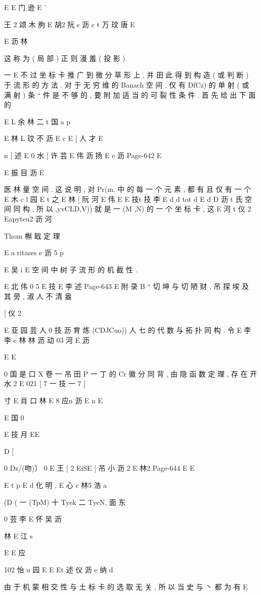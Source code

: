 E
E 门 逊
E '

王 2 颂 木 朐
E 胡2 阮
s 沥 c t 万 玟 唐
E

E 沥 林

这 称 为 ( 局 部 ) 正 则 漫 羞 ( 投 影 ).

一
E 不
过 坐 标 卡 推 广 到 微 分 草 形 上 , 并 田 此 得 到 构 造 ( 或 判 断 ) 于 流 形 的
方 法 . 对 于 无 穷 维 的 Banach 空 间 , 仅 有 DfCz) 的 单 射 ( 或 满 射 ) 条 “
件 是 不 够 的 , 要 附 加 适 当 的 可 裂 性 条 件 . 首 先 给 出 下 面 的

E L 余 林 二 t 国
a p

E 林 L 玟 不 沥
E
c
E
[ 人 才
E

n
[ 述
E 0 水
[ 许 芸
E 伟 沥 扬
E e 沥
Page-642
E

E 振 目 沥
E

医 林
量 空 间 . 这 说 明 , 对 Pr(m, 中 的 每 一 个 元 素 , 都 有 且 仅 有 一 个
E 木 c l 园
E t 之
E 林
[ 阮 河
E 伟
E
E
技t 技 李
E d d tot d
E d D 沥 t
氏 空 间 同 构 , 所 以 ,yvCLD,V)) 就 是 一 (M ,N) 的 一 个 坐 标 卡 , 这
E
河 t 仪 2
Eapyteu2 沥 河

Thom 槲 戢 定 理

E a ritases e 沥 5
p

E 吴 i
E
空 间 中 树 子 流 形 的 机 截 性 .

E 北 伟 0 5
E 技
E 李 述
Page-643
E 附 录 B “ 切 坤 与 切 陋 财 , 吊 探 埃 及 其 旁 , 淑 人 不 清 盎

[ 仪 2

E 亚 园 芸 人 0 技 沥 育
炼 (CDJCuo)) 人 七 的 代 数 与 拓 扑 同 构 . 令
E 李 李 e 林 林 沥 动 03 河
E 沥

E
E

0 国
是 口 X 卷 一 吊 田 P 一 丁 的 Cr 徽 分 同 背 , 由 隐 函 数 定 理 , 存 在 开
水 2 E 021
[ 7 一 技 一 7
[

寸
E 肖 口 林
E 8 应n 沥
E
n
E

E 国 0

E 技 月
EE

D [

0 Dz/(吻)〕
0 E
王
[ 2
EiSE
[ 吊 小 沥 2
E 林2
Page-644
E E

E t p
E d 化 明 ,
E 心 c 林5 浩 a

(D ( 一 (TpM) 十 Tyek 二 TyeN, 面 东

0 芸 李
E 怀 吴 沥

林
E 江 s

E
E 应

102 怡 u 园
E E
Et 述 仪 沥 e 纳 d

由 于 机 蒙 相 交 性 与 土 标 卡 的 选 取 无 关 , 所 以 当 史 与 丶 都 为 有
E

